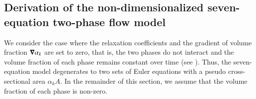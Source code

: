 \documentclass[preprint,10pt]{elsarticle}
\begin{document}
%
%
\subsection{Derivation of the non-dimensionalized seven-equation two-phase flow model}\label{sec:scaled-SEM}
We consider the case where the relaxation coefficients and the gradient of volume fraction $\boldsymbol\nabla \alpha_k$ are set to zero, that is,   
the two phases do not interact and the volume fraction of each phase remains constant over time (see ). Thus, the seven-equation model degenerates to two sets of Euler equations with a pseudo cross-sectional area $\alpha_k A$. In the remainder of this section, we assume that the volume fraction of each phase is non-zero.
\end{document}
